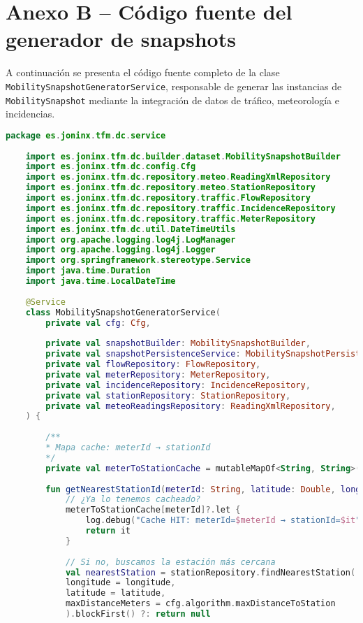 \section*{Anexo B – Código fuente del generador de snapshots}
\label{anexo:snapshot_generator}

A continuación se presenta el código fuente completo de la clase \texttt{MobilitySnapshotGeneratorService}, responsable de generar las instancias de \texttt{MobilitySnapshot} mediante la integración de datos de tráfico, meteorología e incidencias.

\begin{lstlisting}[language=Kotlin, caption={Clase MobilitySnapshotGeneratorService}]
	package es.joninx.tfm.dc.service
	
	import es.joninx.tfm.dc.builder.dataset.MobilitySnapshotBuilder
	import es.joninx.tfm.dc.config.Cfg
	import es.joninx.tfm.dc.repository.meteo.ReadingXmlRepository
	import es.joninx.tfm.dc.repository.meteo.StationRepository
	import es.joninx.tfm.dc.repository.traffic.FlowRepository
	import es.joninx.tfm.dc.repository.traffic.IncidenceRepository
	import es.joninx.tfm.dc.repository.traffic.MeterRepository
	import es.joninx.tfm.dc.util.DateTimeUtils
	import org.apache.logging.log4j.LogManager
	import org.apache.logging.log4j.Logger
	import org.springframework.stereotype.Service
	import java.time.Duration
	import java.time.LocalDateTime
	
	@Service
	class MobilitySnapshotGeneratorService(
		private val cfg: Cfg,
	
		private val snapshotBuilder: MobilitySnapshotBuilder,
		private val snapshotPersistenceService: MobilitySnapshotPersistenceService,
		private val flowRepository: FlowRepository,
		private val meterRepository: MeterRepository,
		private val incidenceRepository: IncidenceRepository,
		private val stationRepository: StationRepository,
		private val meteoReadingsRepository: ReadingXmlRepository,
	) {
		
		/**
		* Mapa cache: meterId → stationId
		*/
		private val meterToStationCache = mutableMapOf<String, String>()
		
		fun getNearestStationId(meterId: String, latitude: Double, longitude: Double): String? {
			// ¿Ya lo tenemos cacheado?
			meterToStationCache[meterId]?.let {
				log.debug("Cache HIT: meterId=$meterId → stationId=$it")
				return it
			}
			
			// Si no, buscamos la estación más cercana
			val nearestStation = stationRepository.findNearestStation(
			longitude = longitude,
			latitude = latitude,
			maxDistanceMeters = cfg.algorithm.maxDistanceToStation
			).blockFirst() ?: return null
			

\end{lstlisting}
